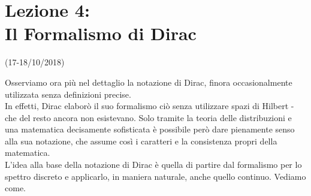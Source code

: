 \documentclass[12pt]{article}
\begin{document}
\section{Lezione 4:\\ \large{Il Formalismo di Dirac}}
\vspace{-1em}
\begin{center}
    \small{(17-18/10/2018)}
\end{center}
Osserviamo ora più nel dettaglio la notazione di Dirac, finora occasionalmente utilizzata senza definizioni precise.\\
In effetti, Dirac elaborò il suo formalismo ciò senza utilizzare spazi di Hilbert - che del resto ancora non esistevano. Solo tramite la teoria delle distribuzioni e una matematica decisamente sofisticata è possibile però dare pienamente senso alla sua notazione, che assume così i caratteri e la consistenza propri della matematica.\\
L'idea alla base della notazione di Dirac è quella di partire dal formalismo per lo spettro discreto e applicarlo, in maniera naturale, anche quello continuo. Vediamo come.\\
\end{document}
